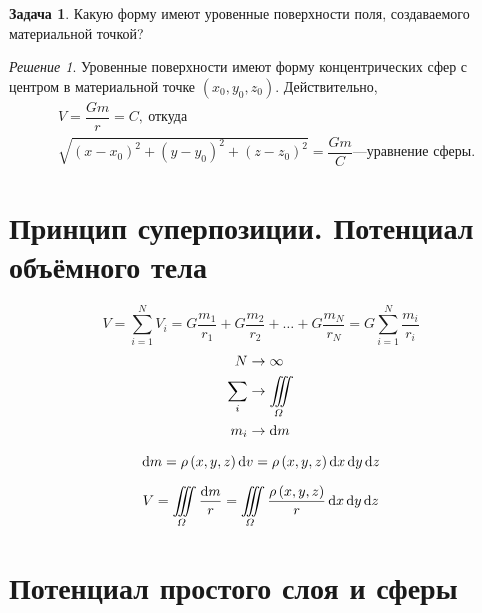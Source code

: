 \documentclass[11pt, a4paper]{article}
\theoremstyle{plain}
\theoremstyle{definition}
\newtheorem{problem}{Задача}[section]
\theoremstyle{remark}
\newtheorem*{solution}{Решение}
\begin{document}
\begin{problem}
    Какую форму имеют уровенные поверхности поля, создаваемого материальной точкой?
\end{problem}
\begin{solution}
    Уровенные поверхности имеют форму концентрических сфер с центром в материальной точке $(x_0, y_0, z_0)$. Действительно,
    \begin{align*}
        &V = \dfrac{Gm}{r} = C,\ \text{откуда} \\
        &\sqrt{\left( x - x_0 \right)^2 +
        \left( y - y_0 \right)^2 + \left( z - z_0 \right)^2} = \dfrac{Gm}{C} \text{---уравнение
        сферы}. 
    \end{align*}
\end{solution}

\section{Принцип суперпозиции. Потенциал объёмного тела}
\begin{equation*}
    V = \sum\limits_{i=1}^{N} V_i = G\dfrac{m_1}{r_1} + G\dfrac{m_2}{r_2} + \dots +
    G\dfrac{m_N}{r_N} = G\sum\limits_{i=1}^{N} \dfrac{m_i}{r_i}
\end{equation*}
\begin{align*}
    N &\to \infty\\
    \sum\limits_{i}&\to\iiint\limits_{\Omega} \\
    m_i&\to\dif m
\end{align*}

\begin{equation*}
    \dif m = \rho\left( x, y, z \right)\dif v = \rho\left( x, y, z \right)\dif x\dif y\dif z
\end{equation*}

\begin{equation*}
    V = \iiint\limits_{\Omega}\dfrac{\dif m}{r} = 
    \iiint\limits_{\Omega}\dfrac{\rho\left( x, y, z \right)}{r}\dif x\dif y\dif z
\end{equation*}

\section{Потенциал простого слоя и сферы}


\printbibliography
\end{document}
